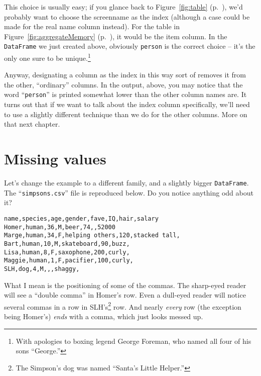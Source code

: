 
This choice is usually easy; if you glance back to Figure~\ref{fig:table}
(p.~\pageref{fig:table}), we'd probably want to choose the \textsf{screenname}
as the index (although a case could be made for the \textsf{real name} column
instead). For the table in Figure~\ref{fig:aggregateMemory}
(p.~\pageref{fig:aggregateMemory}), it would be the \textsf{item} column. In
the \texttt{DataFrame} we just created above, obviously \texttt{person} is the
correct choice -- it's the only one sure to be unique.\footnote{With apologies
to boxing legend George Foreman, who named all four of his sons ``George.''}

Anyway, designating a column as the index in this way sort of removes it from
the other, ``ordinary'' columns. In the output, above, you may notice that the
word ``\texttt{person}'' is printed somewhat lower than the other column names
are. It turns out that if we want to talk about the index column specifically,
we'll need to use a slightly different technique than we do for the other
columns. More on that next chapter.

\section{Missing values}

Let's change the example to a different family, and a slightly bigger
\texttt{DataFrame}. The ``\texttt{simpsons.csv}'' file is reproduced below. Do
you notice anything odd about it?


\begin{Verbatim}[fontsize=\small,samepage=true,frame=lines,framesep=3mm]
name,species,age,gender,fave,IQ,hair,salary
Homer,human,36,M,beer,74,,52000
Marge,human,34,F,helping others,120,stacked tall,
Bart,human,10,M,skateboard,90,buzz,
Lisa,human,8,F,saxophone,200,curly,
Maggie,human,1,F,pacifier,100,curly,
SLH,dog,4,M,,,shaggy,
\end{Verbatim}


What I mean is the positioning of some of the commas. The sharp-eyed reader
will see a ``double comma'' in Homer's row. Even a dull-eyed reader will notice
several commas in a row in SLH's\footnote{The Simpson's dog was named ``Santa's
Little Helper.''} row. And nearly \textit{every} row (the exception being
Homer's) \textit{ends} with a comma, which just looks messed up.

